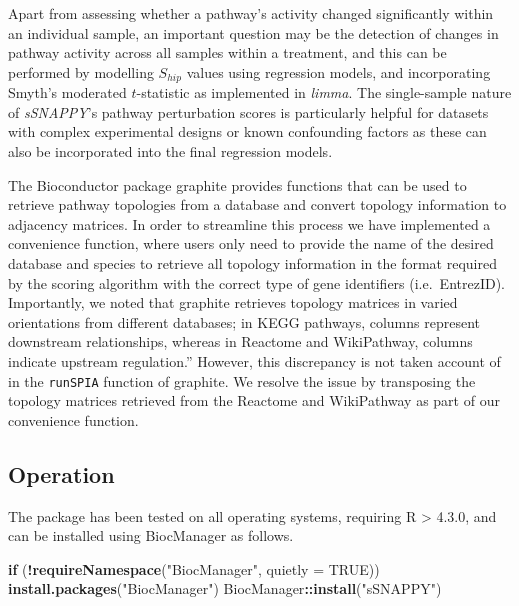 \documentclass[9pt,a4paper,]{extarticle}
\newenvironment{Shaded}{\begin{snugshade}}{\end{snugshade}}
\newcommand{\AttributeTok}[1]{\textcolor[rgb]{0.13,0.29,0.53}{#1}}
\newcommand{\ConstantTok}[1]{\textcolor[rgb]{0.56,0.35,0.01}{#1}}
\newcommand{\ControlFlowTok}[1]{\textcolor[rgb]{0.13,0.29,0.53}{\textbf{#1}}}
\newcommand{\FunctionTok}[1]{\textcolor[rgb]{0.13,0.29,0.53}{\textbf{#1}}}
\newcommand{\NormalTok}[1]{#1}
\newcommand{\SpecialCharTok}[1]{\textcolor[rgb]{0.81,0.36,0.00}{\textbf{#1}}}
\newcommand{\StringTok}[1]{\textcolor[rgb]{0.31,0.60,0.02}{#1}}
\begin{document}
Apart from assessing whether a pathway's activity changed significantly within an individual sample, an important question may be the detection of changes in pathway activity across all samples within a treatment, and this can be performed by modelling \(S_{hip}\) values using regression models, and incorporating Smyth's moderated \(t\)-statistic\citep{Smyth_2004} as implemented in \emph{limma}\citep{limma_2015}.
The single-sample nature of \emph{sSNAPPY}'s pathway perturbation scores is particularly helpful for datasets with complex experimental designs or known confounding factors as these can also be incorporated into the final regression models.

The Bioconductor package graphite\citep{Sales2012} provides functions that can be used to retrieve pathway topologies from a database and convert topology information to adjacency matrices.
In order to streamline this process we have implemented a convenience function, where users only need to provide the name of the desired database and species to retrieve all topology information in the format required by the scoring algorithm with the correct type of gene identifiers (i.e.~EntrezID).
Importantly, we noted that graphite\citep{Sales2012} retrieves topology matrices in varied orientations from different databases; in KEGG pathways, columns represent downstream relationships, whereas in Reactome and WikiPathway, columns indicate upstream regulation.''
However, this discrepancy is not taken account of in the \texttt{runSPIA} function of graphite.
We resolve the issue by transposing the topology matrices retrieved from the Reactome and WikiPathway as part of our convenience function.

\hypertarget{operation}{%
\subsection{Operation}\label{operation}}

The package has been tested on all operating systems, requiring R \textgreater{} 4.3.0, and can be installed using BiocManager as follows.

\begin{Shaded}
\begin{Highlighting}[]
\ControlFlowTok{if}\NormalTok{ (}\SpecialCharTok{!}\FunctionTok{requireNamespace}\NormalTok{(}\StringTok{"BiocManager"}\NormalTok{, }\AttributeTok{quietly =} \ConstantTok{TRUE}\NormalTok{))}
  \FunctionTok{install.packages}\NormalTok{(}\StringTok{"BiocManager"}\NormalTok{)}
\NormalTok{BiocManager}\SpecialCharTok{::}\FunctionTok{install}\NormalTok{(}\StringTok{"sSNAPPY"}\NormalTok{)}
\end{Highlighting}
\end{Shaded}
\end{document}
